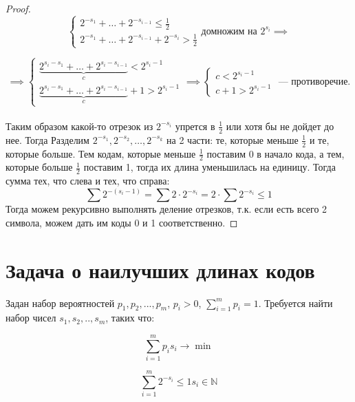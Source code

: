 \begin{proof}
    $$\begin{cases}
        2^{-s_1} + \ldots + 2^{-s_{i-1}} \leq \frac{1}{2}\\
        2^{-s_1} + \ldots + 2^{-s_{i-1}} + 2^{-s_i} > \frac{1}{2}
    \end{cases} \text{домножим на } 2^{s_{i}}\implies$$

    $$\implies \begin{cases}
        \underbrace{2^{s_i - s_1} + \ldots + 2^{s_i - s_{i-1}}}_c < 2^{s_i-1}\\
        \underbrace{2^{s_i - s_1} + \ldots + 2^{s_i - s_{i-1}}}_c + 1 > 2^{s_i-1}
    \end{cases} \implies \begin{cases}
        c < 2^{s_i-1}\\
        c + 1 > 2^{s_i-1}
    \end{cases} \text{ --- противоречие.}$$\\
    Таким образом какой-то отрезок из $2^{-s_i}$ упрется в $\frac{1}{2}$ или хотя бы не дойдет до нее. Тогда 
    Разделим $2^{-s_1}, 2^{-s_2}, \ldots, 2^{-s_k}$ на 2 части: те, которые меньше $\frac{1}{2}$ и те, которые больше.
    Тем кодам, которые меньше $\frac{1}{2}$ поставим 0 в начало кода, а тем, которые больше $\frac{1}{2}$ поставим 1, тогда их длина уменьшилась на единицу. 
    Тогда сумма тех, что слева и тех, что справа:
    \[\sum 2^{-(s_i-1)} = \sum 2 \cdot 2^{-s_i} = 2 \cdot \sum 2^{-s_i} \leq 1\]
    Тогда можем рекурсивно выполнять деление отрезков, т.к. если есть всего 2 символа,
    можем дать им коды 0 и 1 соответственно.
\end{proof}

\section{Задача о наилучших длинах кодов}
Задан набор вероятностей $p_1,p_2,...,p_m$, $p_i >0$, $\sum\limits_{i=1}^mp_i=1$. Требуется найти набор чисел $s_1,s_2,..,s_m$, таких что:

\[\sum\limits_{i=1}^mp_is_i\longrightarrow \min \]
    
\[\sum\limits_{i=1}^m2^{-s_i}\leq1 s_i\in\mathbb {N}\]





